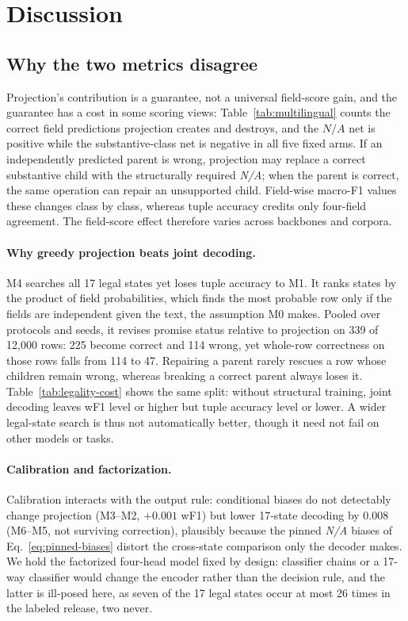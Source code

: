 \section{Discussion}

\subsection{Why the two metrics disagree}
\label{sec:mechanism}
Projection's contribution is a guarantee, not a universal field-score gain, and
the guarantee has a cost in some scoring views: Table~\ref{tab:multilingual}
counts the correct field predictions projection creates and destroys, and the
$N\!/\!A$ net is positive while the substantive-class net is negative in all
five fixed arms. If an independently
predicted parent is wrong, projection may replace a correct substantive child
with the structurally required \emph{N/A}; when the parent is correct, the same
operation can repair an unsupported child. Field-wise macro-F1 values these
changes class by class, whereas tuple accuracy credits only four-field
agreement. The field-score effect therefore varies across backbones and
corpora.

\paragraph{Why greedy projection beats joint decoding.} M4 searches all 17
legal states yet loses tuple accuracy to M1. It ranks states by the product of
field probabilities, which finds the most probable row only if the fields are
independent given the text, the assumption M0 makes. Pooled over protocols and
seeds, it revises promise status relative to projection on 339 of 12{,}000
rows: 225 become correct and 114 wrong, yet whole-row correctness on those rows
falls from 114 to 47. Repairing a parent rarely rescues a row whose children
remain wrong, whereas breaking a correct parent always loses it.
Table~\ref{tab:legality-cost} shows the same split: without structural
training, joint decoding leaves wF1 level or higher but tuple accuracy level or
lower. A wider legal-state search is thus not automatically better, though it
need not fail on other models or tasks.

\paragraph{Calibration and factorization.} Calibration interacts with the
output rule: conditional biases do not detectably change projection (M3--M2,
$+0.001$ wF1) but lower 17-state decoding by $0.008$ (M6--M5, not surviving
correction), plausibly because the pinned \emph{N/A} biases of
Eq.~\eqref{eq:pinned-biases} distort the cross-state comparison only the
decoder makes. We hold the factorized four-head model fixed by design:
classifier chains or a 17-way classifier would change the encoder rather than
the decision rule, and the latter is ill-posed here, as seven of the 17 legal
states occur at most 26 times in the labeled release, two never.

